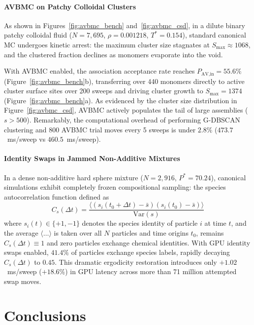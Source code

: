 \documentclass[final,5p,times,twocolumn]{elsarticle}
\begin{document}
\paragraph{AVBMC on Patchy Colloidal Clusters}
As shown in Figures~\ref{fig:avbmc_bench} and~\ref{fig:avbmc_csd}, in
a dilute binary patchy colloidal fluid ($N = 7{,}695$, $\rho =
0.001218$, $T^* = 0.154$), standard canonical MC undergoes kinetic
arrest: the maximum cluster size stagnates at $S_{\max} \approx 1068$,
and the clustered fraction declines as monomers evaporate into the
void.  

With AVBMC enabled, the association acceptance rate reaches
$P_{\text{AV,in}} = \mathbf{55.6\%}$ (Figure~\ref{fig:avbmc_bench}b),
transferring over 440 monomers directly to active cluster surface
sites over 200 sweeps and driving cluster growth to $S_{\max} = 1374$
(Figure~\ref{fig:avbmc_bench}a). As evidenced by the cluster size
distribution in Figure~\ref{fig:avbmc_csd}, AVBMC actively populates
the tail of large assemblies ($s > 500$). Remarkably, the
computational overhead of performing G-DBSCAN clustering and 800 AVBMC
trial moves every 5 sweeps is under $\mathbf{2.8\%}$ ($473.7$~ms/sweep
vs $460.5$~ms/sweep). 

\paragraph{Identity Swaps in Jammed Non-Additive Mixtures}
In a dense non-additive hard sphere mixture ($N = 2{,}916$, $P^* =
70.24$), canonical simulations exhibit completely frozen compositional
sampling: the species autocorrelation function defined as 
\begin{equation}
    C_s(\Delta t) = \frac{\langle (s_i(t_0 + \Delta t) - \bar{s})(s_i(t_0) - \bar{s}) \rangle}{\text{Var}(s)}
\end{equation}
where $s_i(t) \in \{+1, -1\}$ denotes the species identity of particle
$i$ at time $t$, and the average $\langle \dots \rangle$ is taken over
all $N$ particles and time origins $t_0$, remains $C_s(\Delta t) \equiv
1$ and zero particles exchange chemical identities. With GPU 
identity swaps enabled, $41.4\%$ of particles exchange species labels,
rapidly decaying $C_s(\Delta t)$ to $0.45$. This dramatic ergodicity
restoration introduces only $+1.02$~ms/sweep ($+18.6\%$) in GPU
latency across more than 71 million attempted swap moves. 

\section{Conclusions}
\label{sec:conclusions}
\end{document}
